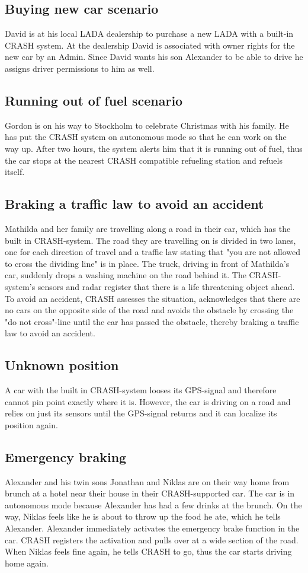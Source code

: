 \documentclass{article}
\begin{document}
\subsection {Buying new car scenario}
David is at his local LADA dealership to purchase a new LADA with a built-in CRASH system. At the dealership David is associated with owner rights for the new car by an Admin. Since David wants his son Alexander to be able to drive he assigns driver permissions to him as well.

\subsection {Running out of fuel scenario}
Gordon is on his way to Stockholm to celebrate Christmas with his family. He has put the CRASH system on autonomous mode so that he can work on the way up. After two hours, the system alerts him that it is running out of fuel, thus the car stops at the nearest CRASH compatible refueling station and refuels itself.

\subsection {Braking a traffic law to avoid an accident}
Mathilda and her family are travelling along a road in their car, which has the built in CRASH-system. The road they are travelling on is divided in two lanes, one for each direction of travel and a traffic law stating that "you are not allowed to cross the dividing line" is in place. The truck, driving in front of Mathilda's car, suddenly drops a washing machine on the road behind it. The CRASH-system's sensors and radar register that there is a life threatening object ahead. To avoid an accident, CRASH assesses the situation, acknowledges that there are no cars on the opposite side of the road and avoids the obstacle by crossing the "do not cross"-line until the car has passed the obstacle, thereby braking a traffic law to avoid an accident.

\subsection {Unknown position}
A car with the built in CRASH-system looses its GPS-signal and therefore cannot pin point exactly where it is. However, the car is driving on a road and relies on just its sensors until the GPS-signal returns and it can localize its position again.

\subsection {Emergency braking}
Alexander and his twin sons Jonathan and Niklas are on their way home from brunch at a hotel near their house in their CRASH-supported car. The car is in autonomous mode because Alexander has had a few drinks at the brunch. On the way, Niklas feels like he is about to throw up the food he ate, which he tells Alexander. Alexander immediately activates the emergency brake function in the car. CRASH registers the activation and pulls over at a wide section of the road. When Niklas feels fine again, he tells CRASH to go, thus the car starts driving home again. 
\end{document}
